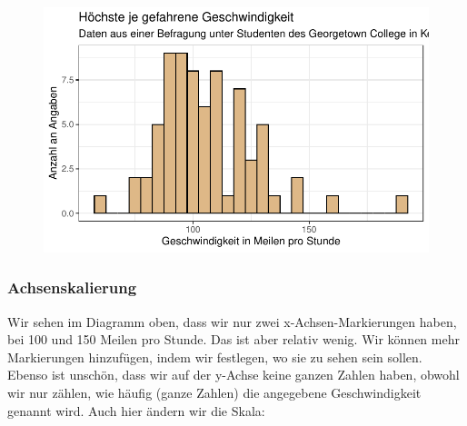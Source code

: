 \documentclass[
  letterpaper,
  DIV=11,
  numbers=noendperiod]{scrartcl}
\begin{document}
\begin{figure}[H]

{\centering \includegraphics{05-visualisierung_files/figure-pdf/unnamed-chunk-13-1.pdf}

}

\end{figure}

\hypertarget{achsenskalierung}{%
\subsubsection{Achsenskalierung}\label{achsenskalierung}}

Wir sehen im Diagramm oben, dass wir nur zwei x-Achsen-Markierungen
haben, bei 100 und 150 Meilen pro Stunde. Das ist aber relativ wenig.
Wir können mehr Markierungen hinzufügen, indem wir festlegen, wo sie zu
sehen sein sollen. Ebenso ist unschön, dass wir auf der y-Achse keine
ganzen Zahlen haben, obwohl wir nur zählen, wie häufig (ganze Zahlen)
die angegebene Geschwindigkeit genannt wird. Auch hier ändern wir die
Skala:
\end{document}
